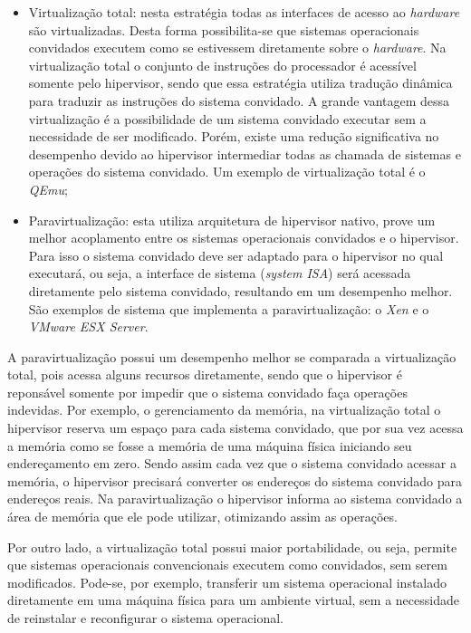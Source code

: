 \begin{itemize}
 \item Virtualização total: nesta estratégia todas as interfaces de acesso ao \textit{hardware} são virtualizadas. Desta forma
 possibilita-se que sistemas operacionais convidados executem como se estivessem diretamente sobre o \textit{hardware}. Na virtualização
 total o conjunto de instruções do processador é acessível somente pelo hipervisor, sendo que essa estratégia utiliza tradução dinâmica
 para traduzir as instruções do sistema convidado. A grande vantagem dessa virtualização é a possibilidade de um sistema convidado 
 executar sem a necessidade de ser modificado. Porém, existe uma redução significativa no desempenho devido ao hipervisor intermediar 
 todas as chamada de sistemas e operações do sistema convidado. Um exemplo de virtualização total é o \textit{QEmu};
 \item Paravirtualização: esta utiliza arquitetura de hipervisor nativo, prove um melhor acoplamento entre os sistemas operacionais 
 convidados e o hipervisor. Para isso o sistema convidado deve ser adaptado para o hipervisor no qual executará, ou seja, a interface de 
 sistema (\textit{system ISA}) será acessada diretamente pelo sistema convidado, resultando em um desempenho melhor. São exemplos de 
 sistema que implementa a paravirtualização: o \textit{Xen} e o \textit{VMware ESX Server}.
\end{itemize}

A paravirtualização possui um desempenho melhor se comparada a virtualização total, pois acessa alguns recursos diretamente, sendo que 
o hipervisor é reponsável somente por impedir que o sistema convidado faça operações indevidas. Por exemplo, o gerenciamento da memória, 
na virtualização total o hipervisor reserva um espaço para cada sistema convidado, que por sua vez acessa a memória como se fosse a memória 
de uma máquina física iniciando seu endereçamento em zero. Sendo assim cada vez que o sistema convidado acessar a memória, o hipervisor 
precisará converter os endereços do sistema convidado para endereços reais. Na paravirtualização o hipervisor informa ao sistema 
convidado a área de memória que ele pode utilizar, otimizando assim as operações.

Por outro lado, a virtualização total possui maior portabilidade, ou seja, permite que sistemas operacionais convencionais executem
como convidados, sem serem modificados. Pode-se, por exemplo, transferir um sistema operacional instalado diretamente em uma máquina física 
para um ambiente virtual, sem a necessidade de reinstalar e reconfigurar o sistema operacional.

